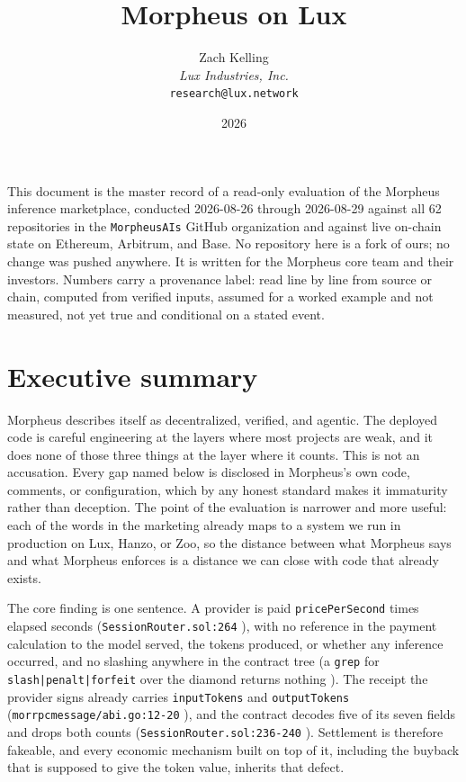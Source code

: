 \documentclass[11pt,a4paper]{article}
\title{Morpheus on Lux}
\author{Zach Kelling\\\textit{Lux Industries, Inc.}\\\texttt{research@lux.network}}
\date{2026}
\newcommand{\code}[1]{\texttt{\small #1}}
\newcommand{\prov}[1]{{\color{muted}\footnotesize\sffamily[#1]}}
\begin{document}
\luxcoverpage

{\small
\noindent This document is the master record of a read-only evaluation of the Morpheus
inference marketplace, conducted 2026-08-26 through 2026-08-29 against all 62 repositories in
the \code{MorpheusAIs} GitHub organization and against live on-chain state on Ethereum,
Arbitrum, and Base. No repository here is a fork of ours; no change was pushed anywhere. It is
written for the Morpheus core team and their investors. Numbers carry a provenance label:
\prov{verified} read line by line from source or chain, \prov{derived} computed from verified
inputs, \prov{illustrative} assumed for a worked example and not measured, \prov{pending} not
yet true and conditional on a stated event.\par}

\vspace{1.2em}
\tableofcontents
\clearpage

\section{Executive summary}

Morpheus describes itself as decentralized, verified, and agentic. The deployed code is
careful engineering at the layers where most projects are weak, and it does none of those
three things at the layer where it counts. This is not an accusation. Every gap named below is
disclosed in Morpheus's own code, comments, or configuration, which by any honest standard
makes it immaturity rather than deception. The point of the evaluation is narrower and more
useful: each of the words in the marketing already maps to a system we run in production on
Lux, Hanzo, or Zoo, so the distance between what Morpheus says and what Morpheus enforces is a
distance we can close with code that already exists.

The core finding is one sentence. A provider is paid \code{pricePerSecond} times elapsed
seconds (\code{SessionRouter.sol:264} \prov{verified}), with no reference in the payment
calculation to the model served, the tokens produced, or whether any inference occurred, and
no slashing anywhere in the contract tree (a \code{grep} for \code{slash|penalt|forfeit} over
the diamond returns nothing \prov{verified}). The receipt the provider signs already carries
\code{inputTokens} and \code{outputTokens} (\code{morrpcmessage/abi.go:12-20} \prov{verified}),
and the contract decodes five of its seven fields and drops both counts
(\code{SessionRouter.sol:236-240} \prov{verified}). Settlement is therefore fakeable, and every
economic mechanism built on top of it, including the buyback that is supposed to give the token
value, inherits that defect.
\end{document}
